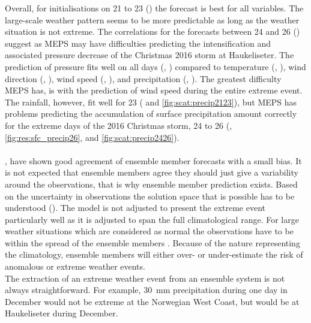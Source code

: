 \noindent
Overall, for initialisations on \num{21} to \SI{23}{\dec} () the forecast is best for all variables. 
The large-scale weather pattern seems to be more predictable as long as the weather situation is not extreme.
The correlations for the forecasts between \num{24} and \SI{26}{\dec} () suggest as MEPS may have difficulties predicting the intensification and associated pressure decrease of the Christmas 2016 storm at Haukeliseter. The prediction of pressure fits well on all days (, ) compared to temperature (, ), wind direction (, ), wind speed (, ), and precipitation (, ). The greatest difficulty MEPS has, is with the prediction of wind speed during the entire extreme event. The rainfall, however, fit well for \SI{23}{\dec} ( and \ref{fig:scat:precip2123}), but MEPS has problems predicting the accumulation of surface precipitation amount correctly for the extreme days of the 2016 Christmas storm, \num{24} to \SI{26}{\dec} (, \ref{fig:res:sfc_precip26}, and \ref{fig:scat:precip2426}).
\\
\\
,  have shown good agreement of ensemble member forecasts with a small bias. It is not expected that ensemble members agree they should just give a variability around the observations, that is why ensemble member prediction exists. Based on the uncertainty in observations the solution space that is possible has to be understood (). The model is not adjusted to present the extreme event particularly well as it is adjusted to span the full climatological range. For large weather situations which are considered as normal the observations have to be within the spread of the ensemble members \citep{owens_ecmwf_2018}. Because of the nature representing the climatology, ensemble members will either over- or under-estimate the risk of anomalous or extreme weather events.
\\
The extraction of an extreme weather event from an ensemble system is not always straightforward. For example, \SI{30}{\mm} precipitation during one day in December would not be extreme at the Norwegian West Coast, but would be at Haukeliseter during December.





